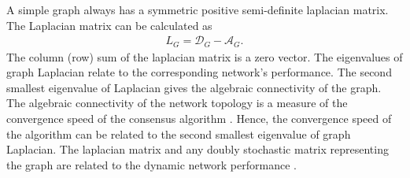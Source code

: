 A simple graph always has a symmetric positive semi-definite laplacian matrix. The Laplacian matrix can be calculated as
\begin{align}\label{2}
L_G=\mathcal{D}_G-\mathcal{A}_G.
\end{align}
The column (row) sum of the laplacian matrix is a zero vector. The eigenvalues of graph Laplacian relate to the corresponding network’s performance. The second smallest eigenvalue of Laplacian gives the algebraic connectivity of the graph. The algebraic connectivity of the network topology is a measure of the convergence speed of the consensus algorithm \cite{olfati2007consensus}. Hence, the convergence speed of the algorithm can be related to the second smallest eigenvalue of graph Laplacian. The laplacian matrix and any doubly stochastic matrix representing the graph are related to the dynamic network performance \cite{xu2011novel}.

